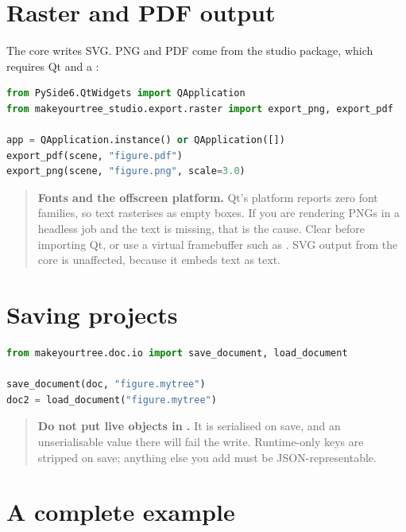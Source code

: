 \section{Raster and PDF output}

The core writes SVG. PNG and PDF come from the studio package, which requires Qt
and a :

\begin{lstlisting}[language=Python]
from PySide6.QtWidgets import QApplication
from makeyourtree_studio.export.raster import export_png, export_pdf

app = QApplication.instance() or QApplication([])
export_pdf(scene, "figure.pdf")
export_png(scene, "figure.png", scale=3.0)
\end{lstlisting}

\begin{quote}
\textbf{Fonts and the offscreen platform.} Qt's  platform reports
zero font families, so text rasterises as empty boxes. If you are rendering PNGs
in a headless job and the text is missing, that is the cause. Clear
 before importing Qt, or use a virtual framebuffer such as
. SVG output from the core is unaffected, because it embeds text as
text.
\end{quote}

\section{Saving projects}

\begin{lstlisting}[language=Python]
from makeyourtree.doc.io import save_document, load_document

save_document(doc, "figure.mytree")
doc2 = load_document("figure.mytree")
\end{lstlisting}

\begin{quote}
\textbf{Do not put live objects in .} It is serialised on
save, and an unserialisable value there will fail the write. Runtime-only keys
are stripped on save; anything else you add must be JSON-representable.
\end{quote}

\section{A complete example}


